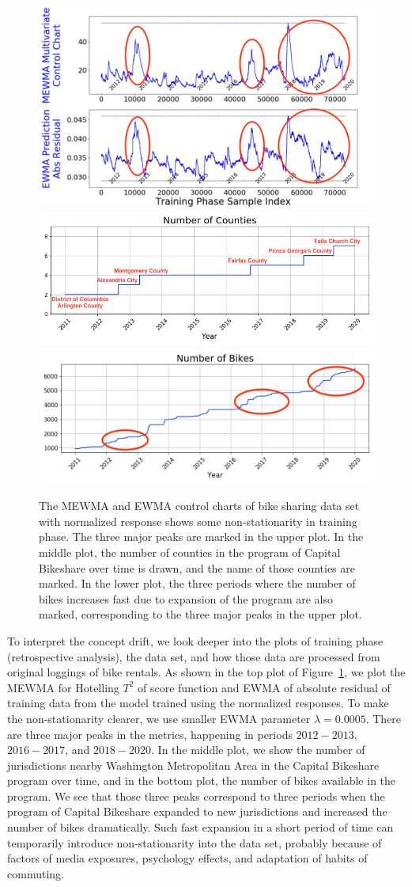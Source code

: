 \documentclass[twoside,11pt]{article}
\begin{document}
\begin{figure}[!htbp]
\centering
\includegraphics[width = 0.5\linewidth]{../figures/v14/bike_sharing/reg_nnet_numer_norm_syr_10_pow_tr_9/marked_train_bike_reg_1e-06_0_0001_0_0005_99_99.png}
\includegraphics[width = 0.5\linewidth]{../figures/v14/bike_sharing/marked_plot_num_counties.png}
\includegraphics[width = 0.5\linewidth]{../figures/v14/bike_sharing/marked_plot_num_bikes.png}
  \caption{
The MEWMA and EWMA control charts of bike sharing data set with normalized response shows some non-stationarity in training phase. The three major peaks are marked in the upper plot. In the middle plot, the number of counties in the program of Capital Bikeshare over time is drawn, and the name of those counties are marked. In the lower plot, the three periods where the number of bikes increases fast due to expansion of the program are also marked, corresponding to the three major peaks in the upper plot.
}
\label{fig:bike_sharing_interp}
\end{figure}


To interpret the concept drift, we look deeper into the plots of training phase (retrospective analysis), the data set, and how those data are processed from original loggings of bike rentals. As shown in the top plot of Figure~\ref{fig:bike_sharing_interp}, we plot the MEWMA for Hotelling $T^2$ of score function and EWMA of absolute residual of training data from the model trained using the normalized responses. To make the non-stationarity clearer, we use smaller EWMA parameter $\lambda=0.0005$. There are three major peaks in the metrics, happening in periods $2012-2013$, $2016-2017$, and $2018-2020$. In the middle plot, we show the number of jurisdictions nearby Washington Metropolitan Area in the Capital Bikeshare program over time, and in the bottom plot, the number of bikes available in the program. We see that those three peaks correspond to three periods when the program of Capital Bikeshare expanded to new jurisdictions and increased the number of bikes dramatically. Such fast expansion in a short period of time can temporarily introduce non-stationarity into the data set, probably because of factors of media exposures, psychology effects, and adaptation of habits of commuting.
\end{document}
